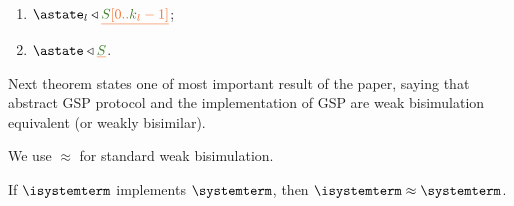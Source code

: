 \begin{definition}
\begin{enumerate}
\begin{itemize}
	
	\end{itemize}	

	\item \label{prop_state_known} $\astate_l \triangleleft \flatten {\queuemessage[0 .. \tknown_l - 1]}$;
	
	\item \label{prop_stateserver} $\astate \triangleleft \flatten{\queuemessage}$.

\end{enumerate}



	
	
\end{definition}

Next theorem states one of most important result of the paper, saying that abstract GSP protocol and the implementation of GSP are weak bisimulation equivalent (or weakly bisimilar).

We use $\approx$ for standard weak bisimulation.

\begin{theorem}
\label{thm:simulation}
 If  $\isystemterm$ implements $\systemterm$, then $\isystemterm\approx\systemterm$. 
\end{theorem}


